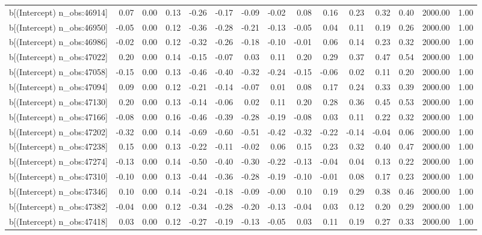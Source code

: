 \begin{table}[ht]
\begin{tabular}{rrrrrrrrrrrrrrr}
  b[(Intercept) n\_obs:46914] & 0.07 & 0.00 & 0.13 & -0.26 & -0.17 & -0.09 & -0.02 & 0.08 & 0.16 & 0.23 & 0.32 & 0.40 & 2000.00 & 1.00 \\ 
  b[(Intercept) n\_obs:46950] & -0.05 & 0.00 & 0.12 & -0.36 & -0.28 & -0.21 & -0.13 & -0.05 & 0.04 & 0.11 & 0.19 & 0.26 & 2000.00 & 1.00 \\ 
  b[(Intercept) n\_obs:46986] & -0.02 & 0.00 & 0.12 & -0.32 & -0.26 & -0.18 & -0.10 & -0.01 & 0.06 & 0.14 & 0.23 & 0.32 & 2000.00 & 1.00 \\ 
  b[(Intercept) n\_obs:47022] & 0.20 & 0.00 & 0.14 & -0.15 & -0.07 & 0.03 & 0.11 & 0.20 & 0.29 & 0.37 & 0.47 & 0.54 & 2000.00 & 1.00 \\ 
  b[(Intercept) n\_obs:47058] & -0.15 & 0.00 & 0.13 & -0.46 & -0.40 & -0.32 & -0.24 & -0.15 & -0.06 & 0.02 & 0.11 & 0.20 & 2000.00 & 1.00 \\ 
  b[(Intercept) n\_obs:47094] & 0.09 & 0.00 & 0.12 & -0.21 & -0.14 & -0.07 & 0.01 & 0.08 & 0.17 & 0.24 & 0.33 & 0.39 & 2000.00 & 1.00 \\ 
  b[(Intercept) n\_obs:47130] & 0.20 & 0.00 & 0.13 & -0.14 & -0.06 & 0.02 & 0.11 & 0.20 & 0.28 & 0.36 & 0.45 & 0.53 & 2000.00 & 1.00 \\ 
  b[(Intercept) n\_obs:47166] & -0.08 & 0.00 & 0.16 & -0.46 & -0.39 & -0.28 & -0.19 & -0.08 & 0.03 & 0.11 & 0.22 & 0.32 & 2000.00 & 1.00 \\ 
  b[(Intercept) n\_obs:47202] & -0.32 & 0.00 & 0.14 & -0.69 & -0.60 & -0.51 & -0.42 & -0.32 & -0.22 & -0.14 & -0.04 & 0.06 & 2000.00 & 1.00 \\ 
  b[(Intercept) n\_obs:47238] & 0.15 & 0.00 & 0.13 & -0.22 & -0.11 & -0.02 & 0.06 & 0.15 & 0.23 & 0.32 & 0.40 & 0.47 & 2000.00 & 1.00 \\ 
  b[(Intercept) n\_obs:47274] & -0.13 & 0.00 & 0.14 & -0.50 & -0.40 & -0.30 & -0.22 & -0.13 & -0.04 & 0.04 & 0.13 & 0.22 & 2000.00 & 1.00 \\ 
  b[(Intercept) n\_obs:47310] & -0.10 & 0.00 & 0.13 & -0.44 & -0.36 & -0.28 & -0.19 & -0.10 & -0.01 & 0.08 & 0.17 & 0.23 & 2000.00 & 1.00 \\ 
  b[(Intercept) n\_obs:47346] & 0.10 & 0.00 & 0.14 & -0.24 & -0.18 & -0.09 & -0.00 & 0.10 & 0.19 & 0.29 & 0.38 & 0.46 & 2000.00 & 1.00 \\ 
  b[(Intercept) n\_obs:47382] & -0.04 & 0.00 & 0.12 & -0.34 & -0.28 & -0.20 & -0.13 & -0.04 & 0.03 & 0.12 & 0.20 & 0.29 & 2000.00 & 1.00 \\ 
  b[(Intercept) n\_obs:47418] & 0.03 & 0.00 & 0.12 & -0.27 & -0.19 & -0.13 & -0.05 & 0.03 & 0.11 & 0.19 & 0.27 & 0.33 & 2000.00 & 1.00 \\ 

\end{tabular}
\end{table}
